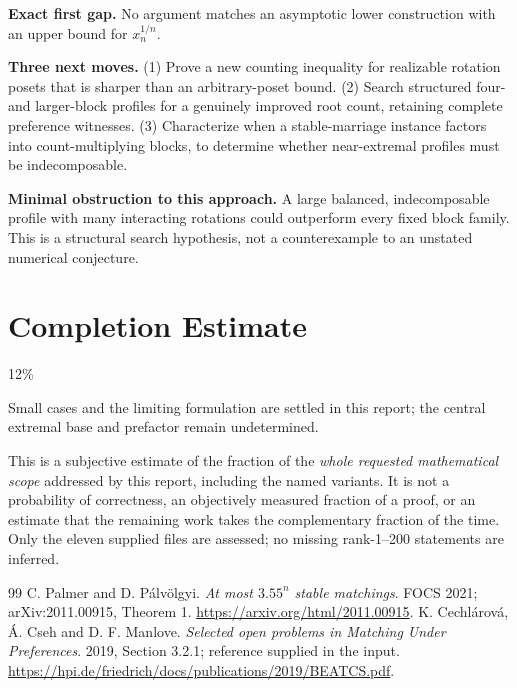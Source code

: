 \documentclass[11pt,a4paper]{article}
\theoremstyle{remark}\newtheorem{remark}[theorem]{Remark}
\begin{document}
\textbf{Exact first gap.} No argument matches an asymptotic lower construction with an upper bound for $x_n^{1/n}$.

\textbf{Three next moves.} (1) Prove a new counting inequality for realizable rotation posets that is sharper than an arbitrary-poset bound. (2) Search structured four- and larger-block profiles for a genuinely improved root count, retaining complete preference witnesses. (3) Characterize when a stable-marriage instance factors into count-multiplying blocks, to determine whether near-extremal profiles must be indecomposable.

\textbf{Minimal obstruction to this approach.} A large balanced, indecomposable profile with many interacting rotations could outperform every fixed block family. This is a structural search hypothesis, not a counterexample to an unstated numerical conjecture.

\section{Completion Estimate}
12\%

Small cases and the limiting formulation are settled in this report; the central extremal base and prefactor remain undetermined.

This is a subjective estimate of the fraction of the \emph{whole requested mathematical scope} addressed by this report, including the named variants. It is not a probability of correctness, an objectively measured fraction of a proof, or an estimate that the remaining work takes the complementary fraction of the time. Only the eleven supplied files are assessed; no missing rank-1--200 statements are inferred.

\begin{thebibliography}{99}
 C. Palmer and D. P\'alv\"olgyi. \emph{At most $3.55^n$ stable matchings}. FOCS 2021; arXiv:2011.00915, Theorem 1. \url{https://arxiv.org/html/2011.00915}.
 K. Cechl\'arov\'a, \'A. Cseh and D. F. Manlove. \emph{Selected open problems in Matching Under Preferences}. 2019, Section 3.2.1; reference supplied in the input. \url{https://hpi.de/friedrich/docs/publications/2019/BEATCS.pdf}.
\end{thebibliography}
\end{document}
